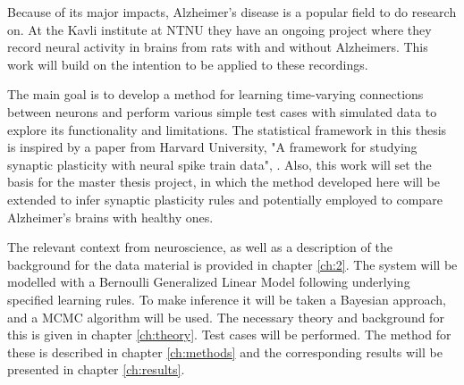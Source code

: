 Because of its major impacts, Alzheimer's disease is a popular field to do research on. At the Kavli institute at NTNU they have an ongoing project where they record neural activity in brains from rats with and without Alzheimers. This work will build on the intention to be applied to these recordings.


The main goal is to develop a method for learning time-varying connections between neurons and perform various simple test cases with simulated data to explore its functionality and limitations. The statistical framework in this thesis is inspired by a paper from Harvard University, "A framework for studying synaptic plasticity with neural spike train data", \cite{Linderman}. Also, this work will set the basis for the master thesis project, in which the method developed here will be extended to infer synaptic plasticity rules and potentially employed to compare Alzheimer's brains with healthy ones.

The relevant context from neuroscience, as well as a description of the background for the data material is provided in chapter \ref{ch:2}. The system will be modelled with a Bernoulli Generalized Linear Model following underlying specified learning rules. To make inference it will be taken a Bayesian approach, and a MCMC algorithm will be used. The necessary theory and background for this is given in chapter \ref{ch:theory}. Test cases will be performed. The method for these is described in chapter \ref{ch:methods} and the corresponding results will be presented in chapter \ref{ch:results}.


